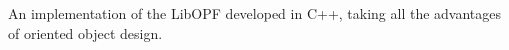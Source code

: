 An implementation of the Lib\+O\+P\+F developed in C++, taking all the advantages of oriented object design. 